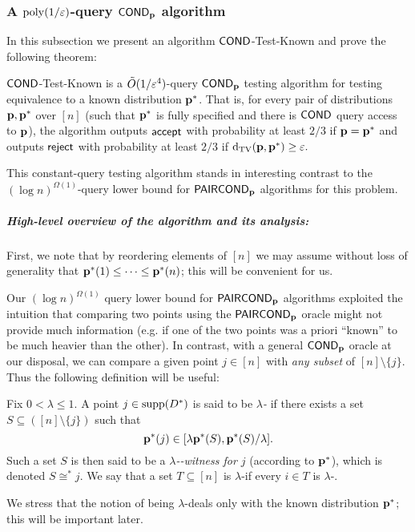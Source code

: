 \subsubsection{\texorpdfstring{A $\operatorname*{poly}(1/\varepsilon)$-query ${\sf COND}_{\mathbf{p}}$ algorithm}{A poly(1/eps)-query \COND algorithm}}
In this subsection
we present an algorithm {\sc ${\sf COND}$-Test-Known}
and prove the following theorem:
\begin{theorem} \label{thm:cond-test-known}
{\sc ${\sf COND}$-Test-Known} is a $\tilde{O}(1/\varepsilon^4)$-query ${\sf COND}_{\mathbf{p}}$
testing algorithm for testing equivalence to a known distribution $\mathbf{p}^\ast$.
{That is,} for every pair of distributions $\mathbf{p},\mathbf{p}^\ast$ over $[n]$
{(such that $\mathbf{p}^\ast$ is fully specified and there is ${\sf COND}$ query access to $\mathbf{p}$),}
the algorithm outputs $\textsf{accept}$ with probability at least $2/3$ if $\mathbf{p} =
\mathbf{p}^\ast$ and outputs $\textsf{reject}$ with probability at least $2/3$ if
\mbox{$\operatorname{d}_{\textrm{TV}}(\mathbf{p},\mathbf{p}^\ast) \geq \varepsilon.$}
\end{theorem}

This constant-query testing algorithm stands in interesting contrast
to the $(\log n)^{\Omega(1)}$-query lower bound for
${\sf PAIRCOND}_{\mathbf{p}}$ algorithms for this problem.

\medskip

\subparagraph{High-level overview of the {algorithm and its analysis:}}
First, we note that by reordering elements of $[n]$ we may assume
without loss of
generality that $\mathbf{p}^\ast(1) \leq \cdots \leq \mathbf{p}^\ast(n)$; this
will be convenient for us.


Our $(\log n)^{\Omega(1)}$ query
lower bound for ${\sf PAIRCOND}_{\mathbf{p}}$ algorithms exploited the
intuition that comparing two points using the ${\sf PAIRCOND}_{\mathbf{p}}$ oracle
might not provide much information (e.g. if one of the two
points was a priori ``known'' to be much heavier than the other).
In contrast, with a general ${\sf COND}_{\mathbf{p}}$ oracle at our disposal,
we can compare a given point $j \in [n]$ with
\emph{any subset} of $[n] \setminus \{j\}.$  Thus the following definition will be useful:

\begin{definition} 
Fix $0 < \lambda \leq 1$. A point $j\in\operatorname{supp}\!\left(D^\ast\right)$ is said to be \emph{$\lambda$-\good}
if there exists a set $S \subseteq
([n] \setminus \{j\})$ such that
\[ \mathbf{p}^\ast(j) \in [ \lambda \mathbf{p}^\ast(S), \mathbf{p}^\ast(S)/\lambda ]. \]
Such a set $S$ is then said to be a \emph{$\lambda$-\good-witness for $j$} (according to $\mathbf{p}^\ast$), which is denoted $
S\cong^\ast j$.
We say that a set $T \subseteq [n]$ is $\lambda$-\good if
every $i \in T$ is $\lambda$-\good.
\end{definition}
We stress that the notion of being $\lambda$-\good deals only with the
known distribution $\mathbf{p}^\ast$; this will be important later.

